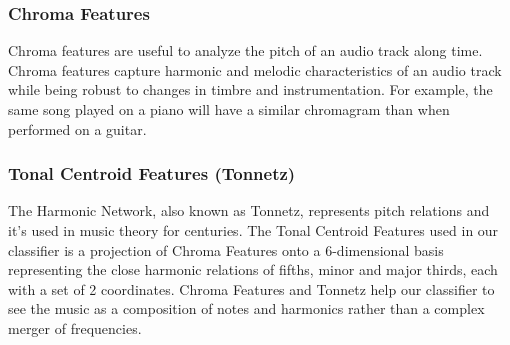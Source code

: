 \subsubsection{Chroma Features}

Chroma features are useful to analyze the pitch of an audio track along time. Chroma features capture harmonic and melodic characteristics of an audio track while being robust to changes in timbre and instrumentation. For example, the same song played on a piano will have a similar chromagram than when performed on a guitar.

\subsubsection{Tonal Centroid Features (Tonnetz)}

The Harmonic Network, also known as Tonnetz, represents pitch relations and it’s used in music theory for centuries. The Tonal Centroid Features used in our classifier is a projection of Chroma Features onto a 6-dimensional basis representing the close harmonic relations of fifths, minor and major thirds, each with a set of 2 coordinates. Chroma Features and Tonnetz help our classifier to see the music as a composition of notes and harmonics rather than a complex merger of frequencies.
